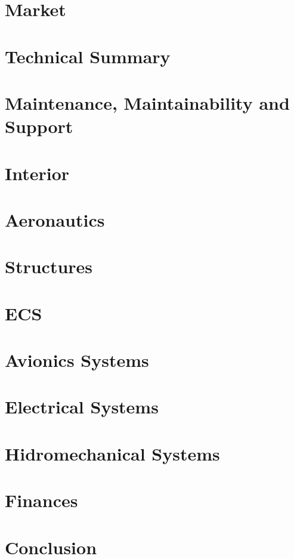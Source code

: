 \documentclass[12pt]{article} %
\numberwithin{figure}{section}
\numberwithin{table}{section}
\begin{document}
\section{Market}
    
    
\setcounter{page}{1}
\section{Technical Summary}
    

\setcounter{page}{1}
\section{Maintenance, Maintainability and Support}
    

\setcounter{page}{1}
\section{Interior}
    

\setcounter{page}{1}
\section{Aeronautics}
    

\setcounter{page}{1}
\section{Structures}
    

\setcounter{page}{1}
\section{ECS}
    

\setcounter{page}{1}
\section{Avionics Systems}
    

\setcounter{page}{1}
\section{Electrical Systems}
    

\setcounter{page}{1}
\section{Hidromechanical Systems}
    

\setcounter{page}{1}
\section{Finances}
    

\setcounter{page}{1}
\section{Conclusion}
    
\end{document}
